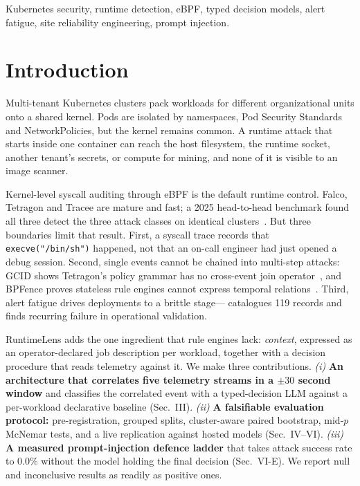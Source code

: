 \documentclass[conference]{IEEEtran}
\begin{document}
\begin{IEEEkeywords}
Kubernetes security, runtime detection, eBPF, typed decision models, alert fatigue, site reliability engineering, prompt injection.
\end{IEEEkeywords}

\section{Introduction}
Multi-tenant Kubernetes clusters pack workloads for different organizational units onto a shared kernel. Pods are isolated by namespaces, Pod Security Standards and NetworkPolicies, but the kernel remains common. A runtime attack that starts inside one container can reach the host filesystem, the runtime socket, another tenant's secrets, or compute for mining, and none of it is visible to an image scanner.

Kernel-level syscall auditing through eBPF is the default runtime control. Falco, Tetragon and Tracee are mature and fast; a 2025 head-to-head benchmark found all three detect the three attack classes on identical clusters~\cite{syairozi2025}. But three boundaries limit that result. First, a syscall trace records that \texttt{execve("/bin/sh")} happened, not that an on-call engineer had just opened a debug session. Second, single events cannot be chained into multi-step attacks: GCID shows Tetragon's policy grammar has no cross-event join operator~\cite{islam2026}, and BPFence proves stateless rule engines cannot express temporal relations~\cite{galletta2026}. Third, alert fatigue drives deployments to a brittle stage---\cite{ndichu2026} catalogues 119 records and finds recurring failure in operational validation.

RuntimeLens adds the one ingredient that rule engines lack: \emph{context}, expressed as an operator-declared job description per workload, together with a decision procedure that reads telemetry against it. We make three contributions. \emph{(i)} \textbf{An architecture that correlates five telemetry streams in a $\pm 30$ second window} and classifies the correlated event with a typed-decision LLM against a per-workload declarative baseline (Sec.~III). \emph{(ii)} \textbf{A falsifiable evaluation protocol:} pre-registration, grouped splits, cluster-aware paired bootstrap, mid-$p$ McNemar tests, and a live replication against hosted models (Sec.~IV--VI). \emph{(iii)} \textbf{A measured prompt-injection defence ladder} that takes attack success rate to $0.0\%$ without the model holding the final decision (Sec.~VI-E). We report null and inconclusive results as readily as positive ones.
\end{document}
